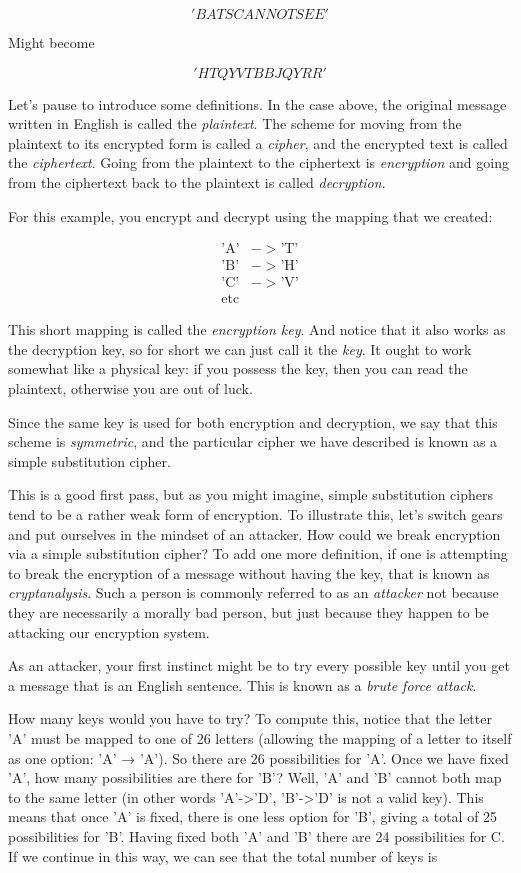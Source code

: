 \documentclass[UTF8]{book}
\begin{document}
\begin{CJK}{UTF8}{gbsn}
   \[ 'BATS CANNOT SEE' \]

Might become

   \[ 'HTQY VTBBJQ YRR' \]

Let's pause to introduce some definitions. In the case above, the original message written in English is called the \emph{plaintext}. The scheme for moving from the plaintext to its encrypted form is called a \emph{cipher}, and the encrypted text is called the \emph{ciphertext}. Going from the plaintext to the ciphertext is \emph{encryption} and going from the ciphertext back to the plaintext is called \emph{decryption}.

For this example, you encrypt and decrypt using the mapping that we created:

\begin{align*}
	\text{'A'} &-> \text{'T'} \\
	\text{'B'} &-> \text{'H'} \\
	\text{'C'} &-> \text{'V'} \\
        \text{etc}
\end{align*}

This short mapping is called the \emph{encryption key}. And notice that it also works as the decryption key, so for short we can just call it the \emph{key}. It ought to work somewhat like a physical key: if you possess the key, then you can read the plaintext, otherwise you are out of luck.

Since the same key is used for both encryption and decryption, we say that this scheme is \emph{symmetric}, and the particular cipher we have described is known as a simple substitution cipher.

This is a good first pass, but as you might imagine, simple substitution ciphers tend to be a rather weak form of encryption. To illustrate this, let's switch gears and put ourselves in the mindset of an attacker. How could we break encryption via a simple substitution cipher? To add one more definition, if one is attempting to break the encryption of a message without having the key, that is known as \emph{cryptanalysis}. Such a person is commonly referred to as an \emph{attacker} not because they are necessarily a morally bad person, but just because they happen to be attacking our encryption system.

As an attacker, your first instinct might be to try every possible key until you get a message that is an English sentence. This is known as a \emph{brute force attack}.

How many keys would you have to try? To compute this, notice that the letter 'A' must be mapped to one of 26 letters (allowing the mapping of a letter to itself as one option: 'A' → 'A'). So there are 26 possibilities for 'A'. Once we have fixed 'A', how many possibilities are there for 'B'? Well, 'A' and 'B' cannot both map to the same letter (in other words 'A'->'D', 'B'->'D' is not a valid key). This means that once 'A' is fixed, there is one less option for 'B', giving a total of 25 possibilities for 'B'. Having fixed both 'A' and 'B' there are 24 possibilities for C. If we continue in this way, we can see that the total number of keys is


\end{CJK}
\end{document}
